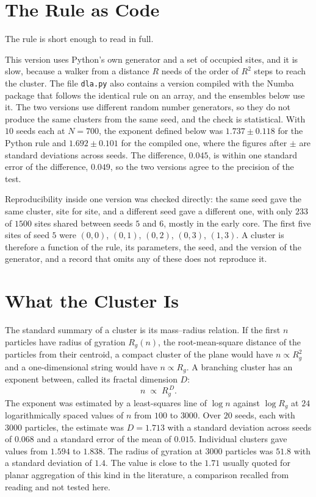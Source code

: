 \section{The Rule as Code}

The rule is short enough to read in full.



This version uses Python's own generator and a set of occupied sites, and it is slow, because a walker from a distance $R$ needs of the order of $R^2$ steps to reach the cluster. The file \texttt{dla.py} also contains a version compiled with the Numba package that follows the identical rule on an array, and the ensembles below use it. The two versions use different random number generators, so they do not produce the same clusters from the same seed, and the check is statistical. With $10$ seeds each at $N=700$, the exponent defined below was $1.737\pm0.118$ for the Python rule and $1.692\pm0.101$ for the compiled one, where the figures after $\pm$ are standard deviations across seeds. The difference, $0.045$, is within one standard error of the difference, $0.049$, so the two versions agree to the precision of the test.

Reproducibility inside one version was checked directly: the same seed gave the same cluster, site for site, and a different seed gave a different one, with only $233$ of $1500$ sites shared between seeds $5$ and $6$, mostly in the early core. The first five sites of seed $5$ were $(0,0)$, $(0,1)$, $(0,2)$, $(0,3)$, $(1,3)$. A cluster is therefore a function of the rule, its parameters, the seed, and the version of the generator, and a record that omits any of these does not reproduce it.

\section{What the Cluster Is}

The standard summary of a cluster is its mass--radius relation. If the first $n$ particles have radius of gyration $R_g(n)$, the root-mean-square distance of the particles from their centroid, a compact cluster of the plane would have $n\propto R_g^2$ and a one-dimensional string would have $n\propto R_g$. A branching cluster has an exponent between, called its fractal dimension $D$:
\[
  n\;\propto\;R_g^{\,D}.
\]
The exponent was estimated by a least-squares line of $\log n$ against $\log R_g$ at $24$ logarithmically spaced values of $n$ from $100$ to $3000$. Over $20$ seeds, each with $3000$ particles, the estimate was $D=1.713$ with a standard deviation across seeds of $0.068$ and a standard error of the mean of $0.015$. Individual clusters gave values from $1.594$ to $1.838$. The radius of gyration at $3000$ particles was $51.8$ with a standard deviation of $1.4$. The value is close to the $1.71$ usually quoted for planar aggregation of this kind in the literature, a comparison recalled from reading and not tested here.

